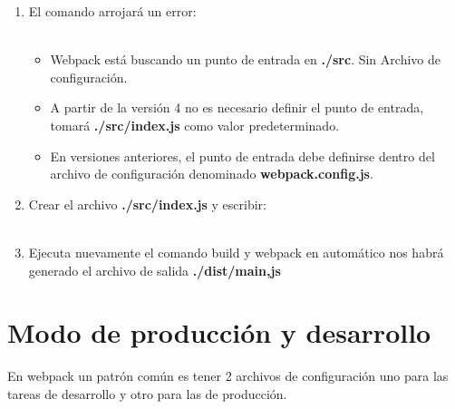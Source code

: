 \begin{enumerate}
    \item El comando arrojará un error:\\
    
    \\
    
    \begin{itemize}
        \item Webpack está buscando un punto de entrada en \textbf{./src}. Sin Archivo de configuración.
        \item A partir de la versión 4 no es necesario definir el punto de entrada, tomará \textbf{./src/index.js} como valor predeterminado.
        \item En versiones anteriores, el punto de entrada debe definirse dentro del archivo de configuración denominado \textbf{webpack.config.js}.

    \end{itemize}
    
    \item Crear el archivo \textbf{./src/index.js} y escribir:\\
    
        \\
    
    \item Ejecuta nuevamente el comando build y webpack en automático nos habrá generado el archivo de salida \textbf{./dist/main,js}
\end{enumerate}

\newpage
\section{Modo de producción y desarrollo}
\item En webpack un patrón común es tener 2 archivos de configuración uno para las tareas de desarrollo y otro para las de producción.

